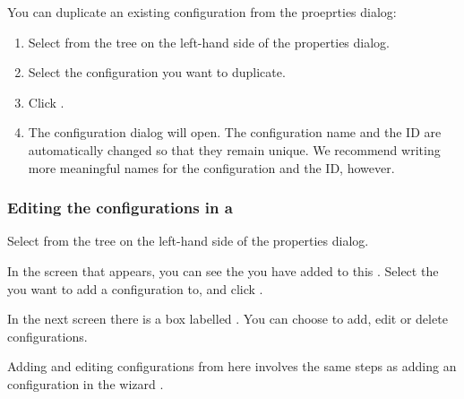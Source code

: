 You can duplicate an existing \gdaut{} configuration from the \gdproject{} proeprties dialog:
\begin{enumerate}
\item Select  from the tree on the left-hand side of the \gdproject{} properties dialog.
\item Select the \gdaut{} configuration you want to duplicate.
\item Click .
\item The \gdaut{} configuration dialog will open. The \gdaut{} configuration name and the \gdaut{} ID are automatically changed so that they remain unique. We recommend writing more meaningful names for the configuration and the ID, however. 
\end{enumerate}


\subsubsection{Editing the \gdaut{} configurations in a \gdproject{}}
\label{ProjPropertiesEditAUTConfig}
Select  from the tree on the left-hand side of the \gdproject{} properties dialog. 

In the screen that appears, you can see the \gdauts{} you have added to this \gdproject{}. Select the \gdaut{} you want to add a configuration to, and click . 

In the next screen there is a box labelled . You can choose to add, edit or delete \gdaut{} configurations. 

Adding and editing \gdaut{} configurations from here involves the same steps as adding an \gdaut{} configuration in the \gdproject{} wizard . 


